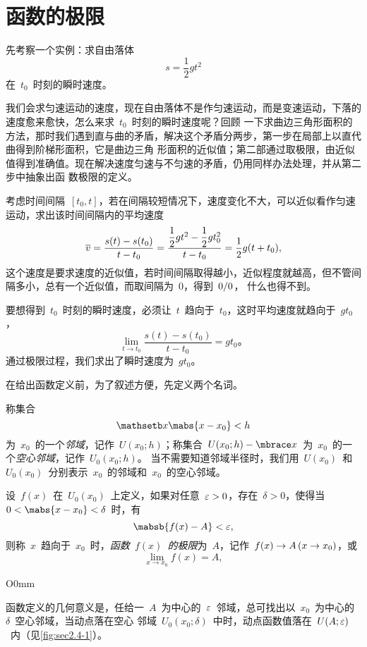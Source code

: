 \section{函数的极限}

先考察一个实例：求自由落体
\[
s=\dfrac12gt^2
\]
在~$t_0$~时刻的瞬时速度。

我们会求匀速运动的速度，现在自由落体不是作匀速运动，而是变速运动，下落的速度愈来愈快，怎么来求~$t_0$~时刻的瞬时速度呢？回顾
一下求曲边三角形面积的方法，那时我们遇到直与曲的矛盾，解决这个矛盾分两步，第一步在局部上以直代曲得到阶梯形面积，它是曲边三角
形面积的近似值；第二部通过取极限，由近似值得到准确值。现在解决速度匀速与不匀速的矛盾，仍用同样办法处理，并从第二步中抽象出函
数极限的定义。

考虑时间间隔~$[t_0,t]$，若在间隔较短情况下，速度变化不大，可以近似看作匀速运动，求出该时间间隔内的平均速度
\[
  \overline{v}=\frac{s(t)-s(t_0)}{t-t_0}=\frac{\dfrac12gt^2-\dfrac12gt_0^2}{t-t_0}=\frac12g(t+t_0),
\]
这个速度是要求速度的近似值，若时间间隔取得越小，近似程度就越高，但不管间隔多小，总有一个近似值，而取间隔为~$0$，得到~$0\mathord{/}0$，%
什么也得不到。

要想得到~$t_0$~时刻的瞬时速度，必须让~$t$~趋向于~$t_0$，这时平均速度就趋向于~$gt_0$，
\[
  \lim_{t\to t_0}\frac{s(t)-s(t_0)}{t-t_0}=gt_0。
\]
通过极限过程，我们求出了瞬时速度为~$gt_0$。

在给出函数定义前，为了叙述方便，先定义两个名词。

称集合
\[
  \mathsetb x{\mabs{x-x_0}<h}
\]
为~$x_0$~的一个\emph{邻域}，记作~$U(x_0;h)$；称集合~$U(x_0;h)-\mbrace x$~为~$x_0$~的一个\emph{空心邻域}，记作~$U_0(x_0;h)$。%
当不需要知道邻域半径时，我们用~$U(x_0)$~和~$U_0(x_0)$~分别表示~$x_0$~的邻域和~$x_0$~的空心邻域。

\begin{definition}\label{def:sec2.4-1}
设~$f(x)$~在~$U_0(x_0)$~上定义，如果对任意~$\varepsilon>0$，存在~$\delta>0$，使得当~$0<\mabs{x-x_0}<\delta$~时，有
\[
  \mabsb{f(x)-A}<\e,
\]
则称~$x$~趋向于~$x_0$~时，\emph{函数~$f(x)$~的极限}为~$A$，记作~$f(x)\to A\mcond{x\to x_0}$，或
\[
  \lim_{x\to x_0}f(x)=A,
\]
\end{definition}


\begin{wrapfigure}{O}{0mm}
\somefigure
\caption{}\label{fig:sec2.4-1}
\end{wrapfigure}

函数定义的几何意义是，任给一~$A$~为中心的~$\varepsilon$~邻域，总可找出以~$x_0$~为中心的~$\delta$~空心邻域，当动点落在空心
邻域~$U_0(x_0;\delta)$~中时，动点函数值落在~$U(A;\varepsilon)$~内（见\ref{fig:sec2.4-1}）。

